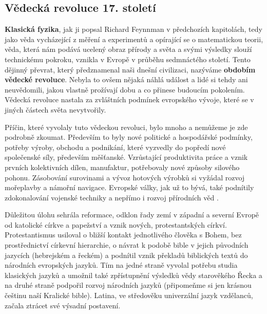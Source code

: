     \subsection{Vědecká revoluce 17. století}\label{fyz:IchapIIsecIIIssecI}
      \textbf{Klasická fyzika}, jak ji popsal Richard Feynnman v předchozích kapitolách, tedy jako
      věda vycházející z měření a experimentů a opírající se o matematickou teorii, věda, která nám
      podává ucelený obraz přírody a světa a svými výsledky slouží technickému pokroku, vznikla v
      Evropě v průběhu sedmnáctého století. Tento dějinný převrat, který předznamenal naši dnešní
      civilizaci, nazýváme \textbf{obdobím vědecké revoluce}. Nebyla to ovšem nějaká náhlá událost a
      lidé si tehdy ani neuvědomili, jakou vlastně prožívají dobu a co přinese budoucím pokolením.
      Vědecká revoluce nastala za zvláštních podmínek evropského vývoje, které se v jiných částech
      světa nevytvořily.

      Příčin, které vyvolaly tuto vědeckou revoluci, bylo mnoho a nemůžeme je zde podrobně zkoumat.
      Především to byly nové politické a hospodářské podmínky, potřeby výroby, obchodu a podnikání,
      které vyzvedly do popředí nové společenské síly, především měšťanské. Vzrůstající produktivita
      práce a vznik prvních kolektivních dílen, manufaktur, potřebovaly nové způsoby silového
      pohonu. Zásobování surovinami a vývoz hotových výrobků si vyžádal rozvoj mořeplavby a námořní
      navigace. Evropské války, jak už to bývá, také podnítily zdokonalování vojenské techniky a
      nepřímo i rozvoj přírodních věd \cite[s.~137]{Stoll2009}.

      Důležitou úlohu sehrála reformace, odklon řady zemí v západní a severní Evropě od katolické
      církve a papežství a vznik nových, protestantských církví. Protestantismus usiloval o bližší
      kontakt jednotlivého člověka s Bohem, bez prostřednictví církevní hierarchie, o návrat k
      podobě bible v jejich původních jazycích (hebrejském a řeckém) a podnítil vznik překladů
      biblických textů do národních evropských jazyků. Tím na jedné straně vyvolal potřebu studia
      klasických jazyků a umožnil také zpřístupnění výsledků vědy starověkého Řecka a na druhé
      straně podpořil rozvoj národních jazyků (připomeňme si jen krásnou češtinu naší Kralické
      bible). Latina, ve středověku univerzální jazyk vzdělanců, začala ztrácet své výsadní
      postavení.

